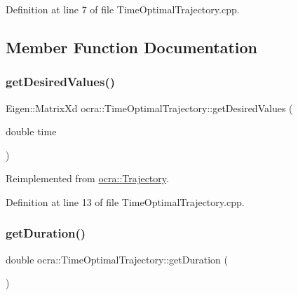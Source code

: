 Definition at line 7 of file Time\+Optimal\+Trajectory.\+cpp.



\subsection{Member Function Documentation}
\hypertarget{classocra_1_1TimeOptimalTrajectory_a42ca0b579494ac0c3c4c842896e592f9}{}\label{classocra_1_1TimeOptimalTrajectory_a42ca0b579494ac0c3c4c842896e592f9} 
\subsubsection{\texorpdfstring{get\+Desired\+Values()}{getDesiredValues()}}
{\footnotesize\ttfamily Eigen\+::\+Matrix\+Xd ocra\+::\+Time\+Optimal\+Trajectory\+::get\+Desired\+Values (\begin{DoxyParamCaption}\item[{double}]{time }\end{DoxyParamCaption})\hspace{0.3cm}{\ttfamily [virtual]}}



Reimplemented from \hyperlink{classocra_1_1Trajectory_a2102a829e6dad497f7c773c346d499b7}{ocra\+::\+Trajectory}.



Definition at line 13 of file Time\+Optimal\+Trajectory.\+cpp.

\hypertarget{classocra_1_1TimeOptimalTrajectory_a561d2d6ad9c40c88783265a91193a0ab}{}\label{classocra_1_1TimeOptimalTrajectory_a561d2d6ad9c40c88783265a91193a0ab} 
\subsubsection{\texorpdfstring{get\+Duration()}{getDuration()}}
{\footnotesize\ttfamily double ocra\+::\+Time\+Optimal\+Trajectory\+::get\+Duration (\begin{DoxyParamCaption}{ }\end{DoxyParamCaption})\hspace{0.3cm}{\ttfamily [virtual]}}



